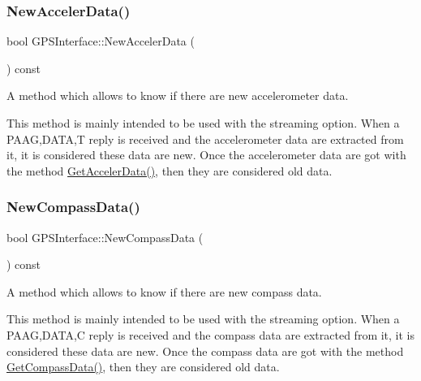 \subsubsection{\texorpdfstring{New\+Acceler\+Data()}{NewAccelerData()}}
{\footnotesize\ttfamily bool G\+P\+S\+Interface\+::\+New\+Acceler\+Data (\begin{DoxyParamCaption}{ }\end{DoxyParamCaption}) const\hspace{0.3cm}{\ttfamily [inline]}}



A method which allows to know if there are new accelerometer data. 

This method is mainly intended to be used with the streaming option. When a P\+A\+AG,D\+A\+TA,T reply is received and the accelerometer data are extracted from it, it is considered these data are new. Once the accelerometer data are got with the method \hyperlink{classGPSInterface_a550dfc4020abe8de5d64802a15404fd2}{Get\+Acceler\+Data()}, then they are considered old data. \mbox{\label{classGPSInterface_a4ced63a896cdadd2c49dab6beb0502a5}} 
\subsubsection{\texorpdfstring{New\+Compass\+Data()}{NewCompassData()}}
{\footnotesize\ttfamily bool G\+P\+S\+Interface\+::\+New\+Compass\+Data (\begin{DoxyParamCaption}{ }\end{DoxyParamCaption}) const\hspace{0.3cm}{\ttfamily [inline]}}



A method which allows to know if there are new compass data. 

This method is mainly intended to be used with the streaming option. When a P\+A\+AG,D\+A\+TA,C reply is received and the compass data are extracted from it, it is considered these data are new. Once the compass data are got with the method \hyperlink{classGPSInterface_a128eca920d581fafa3a497db0a385c31}{Get\+Compass\+Data()}, then they are considered old data. \mbox{\label{classGPSInterface_af09baa1ae4d3b7618272d1c5bfbc5bd6}} 
